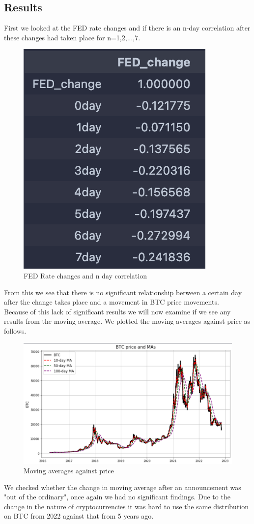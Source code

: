 \documentclass[12pt]{article}
\begin{document}
\subsection{Results}
First we looked at the FED rate changes and if there is an n-day correlation after these changes had taken place for n=1,2,...,7.
\begin{figure}[H]
   \includegraphics[scale=0.7]{research_project/text/paper/1.png}
   \centering
   \caption{FED Rate changes and n day correlation}
   \label{fig:FED Rate evolution 2016 - 2022}
\end{figure}
From this we see that there is no significant relationship between a certain day after the change takes place and a movement in BTC price movements.\\

Because of this lack of significant results we will now examine if we see any results from the moving average. We plotted the moving averages against price as follows.
\begin{figure}[H]
   \includegraphics[scale=0.7]{research_project/text/paper/2.png}
   \centering
   \caption{Moving averages against price}
   \label{fig:FED Rate evolution 2016 - 2022}
\end{figure}
We checked whether the change in moving average after an announcement was "out of the ordinary", once again we had no significant findings. Due to the change in the nature of cryptocurrencies it was hard to use the same distribution on BTC from 2022 against that from 5 years ago.
\end{document}
